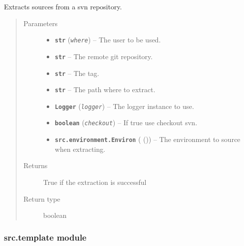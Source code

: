 \documentclass[a4paper,10pt,english]{sphinxmanual}
\begin{document}
\begin{fulllineitems}
\label{commands/apidoc/src:src.system.svn_extract}
Extracts sources from a svn repository.
\begin{quote}\begin{description}
\item[{Parameters}] \leavevmode\begin{itemize}
\item {} 
\textbf{\texttt{str}} (\emph{\texttt{where}}) -- The user to be used.

\item {} 
\textbf{\texttt{str}} -- The remote git repository.

\item {} 
\textbf{\texttt{str}} -- The tag.

\item {} 
\textbf{\texttt{str}} -- The path where to extract.

\item {} 
\textbf{\texttt{Logger}} (\emph{\texttt{logger}}) -- The logger instance to use.

\item {} 
\textbf{\texttt{boolean}} (\emph{\texttt{checkout}}) -- If true use checkout svn.

\item {} 
\textbf{\texttt{src.environment.Environ}} ({\hyperref[commands/apidoc/src:module\string-src.environment]{}} ()) -- The environment to source when
extracting.

\end{itemize}

\item[{Returns}] \leavevmode
True if the extraction is successful

\item[{Return type}] \leavevmode
boolean

\end{description}\end{quote}

\end{fulllineitems}



\subsubsection{src.template module}
\label{commands/apidoc/src:module-src.template}\label{commands/apidoc/src:src-template-module}
\end{document}
